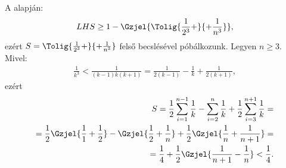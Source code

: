 A  alapján:
$$
LHS \ge 1 - \Gzjel{ \Tolig{\frac{1}{2^{3}}+}{+\frac{1}{n^{3}}}},
$$
ezért 
$S=\Tolig{\frac{1}{2^{3}}+}{+\frac{1}{n^{3}}}$ felső becslésével póbálkozunk.
Legyen $n\ge 3.$ Mivel: 
\begin{align*}
\frac{1}{k^{3}} < \frac{1}{(k-1)k(k+1)}=\frac{1}{2(k-1)} - \frac{1}{k} + \frac{1}{2(k+1)},
\end{align*}
ezért
\begin{align*}
S = \frac{1}{2} \sum_{i=1}^{n-1} \frac{1}{k} - \sum_{i=2}^{n} \frac{1}{k} + 
\frac{1}{2} \sum_{i=3}^{n+1} \frac{1}{k} = \\
= \frac{1}{2}\Gzjel{\frac{1}{1}+\frac{1}{2}}-
\Gzjel{\frac{1}{2}+\frac{1}{n}}+\frac{1}{2}\Gzjel{\frac{1}{n}+\frac{1}{n+1}}=\\
= \frac{1}{4}+\frac{1}{2}\Gzjel{\frac{1}{n+1}-\frac{1}{n}}<\frac{1}{4}.
\end{align*}


